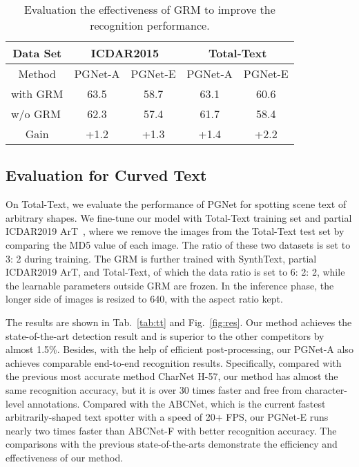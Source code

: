 \documentclass[letterpaper]{article} \usepackage{aaai21}  \usepackage{times}  \usepackage{helvet} \usepackage{courier}  \usepackage[hyphens]{url}  \usepackage{graphicx} \urlstyle{rm} \def\UrlFont{\rm}  \usepackage{natbib}  \usepackage{caption} \usepackage{bm}
\begin{document}
\begin{table}[]
    \centering
    \tabcolsep=4pt\relax
    \begin{tabular}{c|c|c|c|c}
    \hline
    Data Set                            & \multicolumn{2}{c|}{ICDAR2015} & \multicolumn{2}{c}{Total-Text} \\ \hline
    Method                              & PGNet-A        & PGNet-E       & PGNet-A        & PGNet-E       \\ \hline
    \multicolumn{1}{l|}{with GRM}       & 63.5           & 58.7          & 63.1           & 60.6          \\
    \multicolumn{1}{l|}{w/o GRM}        & 62.3           & 57.4          & 61.7           & 58.4          \\ \hline
    Gain                                & +1.2           & +1.3          & +1.4           & +2.2          \\ \hline
    \end{tabular}
    \caption{Evaluation the effectiveness of GRM to improve the recognition performance.}
    \label{tab:ab_grm}
\end{table}


\subsection{Evaluation for Curved Text}
On Total-Text, we evaluate the performance of PGNet for spotting scene text of arbitrary shapes. We fine-tune our model with Total-Text training set and partial ICDAR2019 ArT~\cite{icdar19art}, where we remove the images from the Total-Text test set by comparing the MD5 value of each image. The ratio of these two datasets is set to 3: 2 during training. The GRM is further trained with SynthText, partial ICDAR2019 ArT, and Total-Text, of which the data ratio is set to 6: 2: 2, while the learnable parameters outside GRM are frozen. In the inference phase, the longer side of images is resized to 640, with the aspect ratio kept.

The results are shown in Tab.~\ref{tab:tt} and Fig.~\ref{fig:res}. Our method achieves the state-of-the-art detection result and is superior to the other competitors by almost 1.5\%. Besides, with the help of efficient post-processing, our PGNet-A also achieves comparable end-to-end recognition results. Specifically, compared with the previous most accurate method CharNet H-57, our method has almost the same recognition accuracy, but it is over 30 times faster and free from character-level annotations. Compared with the ABCNet, which is the current fastest arbitrarily-shaped text spotter with a speed of 20+ FPS, our PGNet-E runs nearly two times faster than ABCNet-F with better recognition accuracy. The comparisons with the previous state-of-the-arts demonstrate the efficiency and effectiveness of our method.
\end{document}
